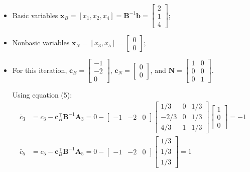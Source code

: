 \documentclass[11pt]{article}
\newcommand{\mb}[1]{\ensuremath{\boldsymbol{#1}}}
\begin{document}
\begin{enumerate}
\begin{itemize}
\item Basic variables $\mb{x}_B = [x_1, x_2, x_4] = \mb{B}^{-1}\mb{b} = \begin{bmatrix} 2 \\ 1 \\ 4 \end{bmatrix}$;

\item Nonbasic variables $\mb{x}_N = [x_3, x_5] = \begin{bmatrix} 0 \\ 0 \end{bmatrix}$;

\item For this iteration, $\mb{c}_B = \begin{bmatrix} -1 \\ -2 \\ 0 \end{bmatrix}$, $\mb{c}_N = \begin{bmatrix} 0 \\ 0 \end{bmatrix}$, and $\mb{N} = \begin{bmatrix} 1 & 0 \\ 0 & 0 \\ 0 & 1 \end{bmatrix}$.

Using equation (5):
\begin{align*}
\bar{c}_3 &= c_3 - \mb{c}_B^\top\mb{B}^{-1}\mb{A}_3 = 0 - \begin{bmatrix} -1 & -2 & 0 \end{bmatrix} \begin{bmatrix} 1/3 & 0 & 1/3 \\ -2/3 & 0 & 1/3 \\ 4/3 & 1 & 1/3 \end{bmatrix} \begin{bmatrix} 1 \\ 0 \\ 0 \end{bmatrix} = -1 \\
\bar{c}_5 &= c_5 - \mb{c}_B^\top\mb{B}^{-1}\mb{A}_5 = 0 - \begin{bmatrix} -1 & -2 & 0 \end{bmatrix} \begin{bmatrix} 1/3 \\ 1/3 \\ 1/3 \end{bmatrix} = 1
\end{align*}


\end{itemize}
\end{enumerate}
\end{document}
